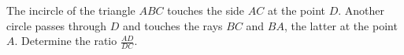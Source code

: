 The incircle of the triangle $ABC$ touches the side $AC$ at the point $D$. Another circle passes through $D$ and touches the rays $BC$ and $BA$,  the latter at the point $A$. Determine the ratio $\frac{AD}{DC}$.